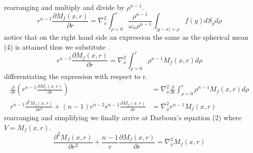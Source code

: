 \documentclass[]{article}
\begin{document}
rearranging and multiply and divide by $\rho^{n-1}$.
\[
    r^{n-1} \frac{\partial M_f (x,r)}{\partial r} =  \nabla_{x}^{2}\int_{\rho = 0}^{r} \frac{\rho^{n-1}}{\omega_n \rho^{n-1}} \int_{|y-x|= \rho}f(y)dS_y d\rho    
\]
notice that on the right hand side an expression the same as the spherical mean (4) is attained thus we substitute .
\[
    r^{n-1} \frac{\partial M_f (x,r)}{\partial r} = \nabla_{x}^{2}\int_{\rho = 0}^{r} \rho^{n-1} M_{f}(x,r) d\rho    
\]
differentiating the expression with respect to r.
\begin{align*}
\frac{\partial}{\partial r}\left( r^{n-1} \frac{\partial M_f (x,r)}{\partial r}\right) &= \nabla_{x}^{2} \frac{\partial}{\partial r}\int_{\rho = 0}^{r} \rho^{n-1} M_{f}(x,r) d\rho
\\
r^{n-1} \frac{\partial^2 M_f (x,r)}{\partial r^2} + (n-1)r^{n-2}r^{n-1} \frac{\partial M_f (x,r)}{\partial r} &= \nabla_{x}^{2} r^{n-1} M_f (x,r)
\end{align*}
rearranging and simplifying we finally arrive at Darboux's equation (2) where $ V=M_f (x,r) $.
\[
    \frac{\partial^2 M_f (x,r)}{\partial r^2} + \frac{n-1}{r} \frac{\partial M_f (x,r)}{\partial r} = \nabla_{x}^{2} M_f (x,r)    
\]


\setcounter{equation}{0}
\setcounter{footnote}{0}
\end{document}
